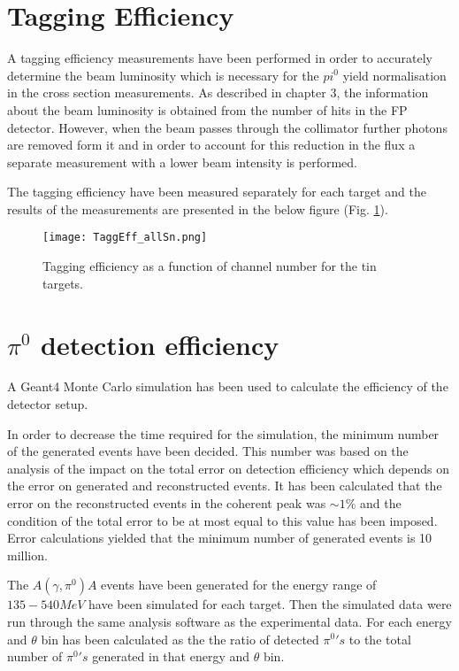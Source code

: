 \section{Tagging Efficiency}

\indent A tagging efficiency measurements have been performed in order to accurately  determine the beam luminosity which is necessary for the $pi^{0}$ yield normalisation in the cross section measurements. As described in chapter 3, the information about the beam luminosity is obtained from the number of hits in the FP detector. However, when the beam passes through the collimator further photons are removed form it and in order to account for this reduction in the flux a separate measurement with a lower beam intensity is performed.

\indent The tagging efficiency have been measured separately for each target and the results of the measurements are presented in the below figure (Fig. \ref{taggingeff}).

\begin{figure}[H]
\begin{center}
\texttt{[image: TaggEff\_allSn.png]}
\caption{Tagging efficiency as a function of channel number for the tin targets.}
\label{taggingeff}
\end{center}
\end{figure}


\section{$\pi^{0}$ detection efficiency}

\indent A Geant4 Monte Carlo simulation has been used to calculate the efficiency of the detector setup.

\indent In order to decrease the time required for the simulation, the minimum number of the generated events have been decided. This number was based on the analysis of the impact on the total error on detection efficiency which depends on the error on generated and reconstructed events. It has been calculated that the error on the reconstructed events in the coherent peak was $\sim1\%$ and the condition of the total error to be at most equal to this value has been imposed. Error calculations yielded that the minimum number of generated events is 10 million.

\indent The $A(\gamma,\pi^{0})A$ events have been generated for the energy range of $135-540MeV$ have been simulated for each target. Then the simulated data were run through the same analysis software as the experimental data. For each energy and $\theta$ bin has been calculated as the the ratio of detected $\pi^{0}'s$ to the total number of $\pi^{0}'s$ generated in that energy and $\theta$ bin.

